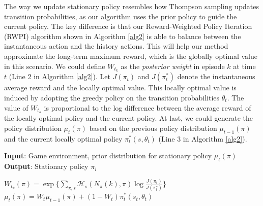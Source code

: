 \documentclass{article}
\theoremstyle{plain}
\theoremstyle{definition}
\theoremstyle{remark}
\begin{document}
The way we update stationary policy resembles how Thompson sampling updates transition probabilities, as our algorithm uses the prior policy to guide the current policy. The key difference is that our Reward-Weighted Policy Iteration (RWPI) algorithm shown in Algorithm \ref{alg2} is able to balance between the instantaneous action and the history actions. This will help our method approximate the long-term maximum reward, which is the globally optimal value in this scenario. We could define $W_{t_{k}}$ as the \emph{posterior weight} in episode $k$ at time $t$ (Line 2 in Algorithm \ref{alg2}). Let $J(\pi_{t})$ and $J(\pi_{t}^{*})$ denote the instantaneous average reward and the locally optimal value. This locally optimal value is induced by adopting the greedy policy on the transition probabilities $\theta_{t}$. The value of $W_{t_{k}}$ is proportional to the log difference between the average reward of the locally optimal policy and the current policy. At last, we could generate the policy distribution $\mu_{t}(\pi)$ based on the previous policy distribution $\mu_{t-1}(\pi)$ and the current locally optimal policy $\pi_{t}^{*}(s,\theta_{t})$ (Line 3 in Algorithm \ref{alg2}). 


\begin{algorithm}[ht]
\caption{Reward-Weighted Policy Iteration(RWPI)}
\label{alg2}
\textbf{Input}: Game environment, prior distribution for stationary policy $\mu_{t}(\pi)$\\
\textbf{Output}: Stationary policy $\pi_{i}$
\begin{algorithmic}[1] %
\REPEAT
\STATE $W_{t_{k}}(\pi) = \exp\{ \sum_{\pi,s}\mathcal{H}_{s}(N_{\pi}(k),\pi)\log \frac{J(\pi_{t})}{J(\pi_{t}^{*})}\}$
\STATE $\mu_{t}(\pi) = W_{t}  \mu_{t-1}(\pi) + (1-W_{t})\pi_{t}^{*}(s_{t},\theta_{t})$
\end{algorithmic}
\end{algorithm}
\end{document}
